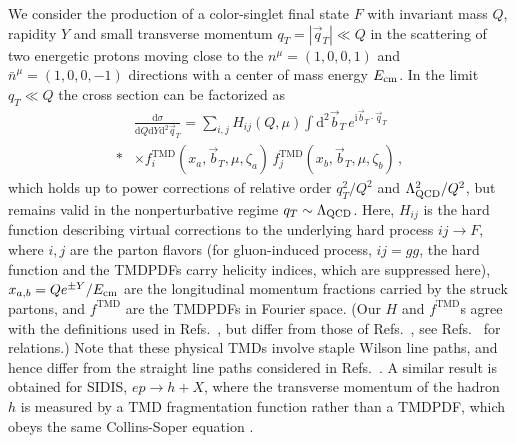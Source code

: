 \documentclass[prd,aps,twocolumn,bibnotes,nofootinbib,preprintnumbers,floatfix]{revtex4-1}
\DeclareRobustCommand{\mycites}[1]{Refs.~\cite{#1}}
\newcommand{\df}{\mathrm{d}}
\newcommand{\img}{\mathrm{i}}
\newcommand{\nn}{\nonumber}
\newcommand{\LQCD}{\Lambda_{\rm QCD}}
\newcommand{\Ecm}{E_{\rm cm}}
\newcommand{\bn}{{\bar{n}}}
\newcommand{\bt}{\vec b_T}
\newcommand{\qt}{\vec q_T}
\newcommand\TMD{\mathrm{TMD}}
\begin{document}
We consider the production of a color-singlet final state $F$
with invariant mass $Q$, rapidity $Y$ and small transverse momentum $q_T=|\qt| \ll Q$
in the scattering of two energetic protons moving close to the
$n^\mu = (1,0,0,1)$ and $\bn^\mu = (1,0,0,-1)$ directions with a center of mass energy $\Ecm$.
In the limit $q_T \ll Q$ the cross section can be factorized as
\begin{align} \label{eq:sigma}
 &\frac{\df\sigma}{\df Q \df Y \df^2\qt}
 = \sum_{i,j} H_{ij}(Q,\mu) \int\!\! \df^2\bt \, e^{\img \bt \cdot \qt}
 \nn\\* &\times
 f^\TMD_i(x_a, \bt, \mu, \zeta_a) \,
 f^\TMD_j(x_b, \bt, \mu, \zeta_b)
\,,\end{align}
which holds up to power corrections of relative order $q_T^2/Q^2$ and $\LQCD^2/Q^2$, but remains valid in the nonperturbative regime $q_T\sim \LQCD$. 
Here, $H_{ij}$ is the hard function describing virtual corrections to the underlying hard process $ij\to F$, where $i,j$ are the parton flavors
(for gluon-induced process, $ij=gg$, the hard function and the TMDPDFs carry helicity indices, which are suppressed here),
$x_{a,b} = Q e^{\pm Y}/\Ecm$ are the longitudinal momentum fractions carried by the struck partons,
and $f^\TMD$ are the TMDPDFs in Fourier space.
%
(Our $H$ and $f^\TMD$s agree with the definitions used in \mycites{Collins:1350496,Catani:2000vq,Becher:2010tm,Becher:2011dz,Chiu:2012ir,GarciaEchevarria:2011rb,Gehrmann:2012ze,Li:2016axz,Echevarria:2016scs}, but differ from those of \mycites{Collins:1981uk,Collins:1981va,Collins:1984kg,Ji:2004wu}, see \mycites{Prokudin:2015ysa,Collins:2017oxh} for relations.) Note that these physical TMDs involve staple Wilson line paths, and hence differ from the straight line paths considered in \mycites{Hagler:2009mb,Musch:2010ka,Radyushkin:2017cyf}.
%
A similar result is obtained for SIDIS, $e p \to h + X$, where the transverse momentum of the  hadron $h$ is measured  by a TMD fragmentation function rather than a TMDPDF,
which obeys the same Collins-Soper equation \cite{Collins:1350496}.
\end{document}
